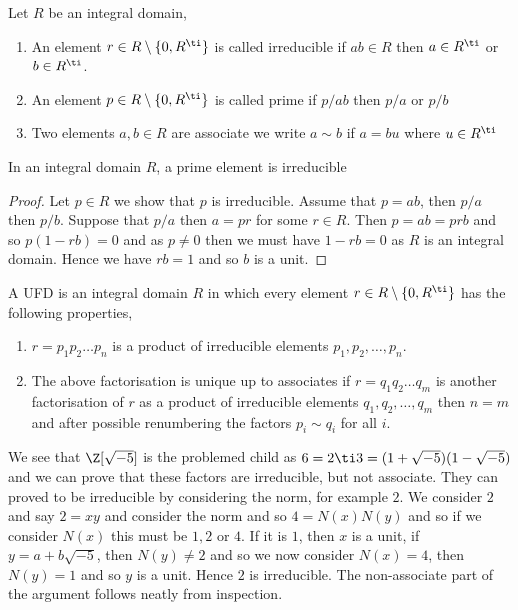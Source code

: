 \begin{ndefi}
  Let $R$ be an integral domain,
  \begin{enumerate}
    \item An element $r \in R \setminus \{0, R^\ti\}$ is called irreducible if $ab \in R$ then $a \in R^\ti$ or $b \in R^\ti$.
    \item An element $p \in R\setminus\{0, R^\ti\}$ is called prime if $p/ab$ then $p/a$ or $p/b$
    \item Two elements $a, b \in R$ are associate we write $a \sim b$ if $a = bu$ where $u \in R^\ti$
  \end{enumerate}
\end{ndefi}

\begin{nprop}
   In an integral domain $R$, a prime element is irreducible
\end{nprop}
\begin{proof}
  Let $p \in R$ we show that $p$ is irreducible. Assume that $p = ab$, then $p/a$ then $p/b$. Suppose that $p/a$ then $a = pr$ for some $r \in R$. Then $p = ab = prb$ and so $p(1 - rb) = 0$ and as $p \ne 0$ then we must have $1 - rb = 0$ as $R$ is an integral domain. Hence we have $rb = 1$ and so $b$ is a unit.
\end{proof}

\begin{ndefi}
  A UFD is an integral domain $R$ in which every element $r \in R\setminus \{0, R^\ti\}$ has the following properties,
  \begin{enumerate}
    \item $r = p_1p_2\dots p_n$ is a product of irreducible elements $p_1, p_2, \dots, p_n$.
    \item The above factorisation is unique up to associates if $r = q_1q_2 \dots q_m$ is another factorisation of $r$ as a product of irreducible elements $q_1, q_2, \dots, q_m$ then $n = m$ and after possible renumbering the factors $p_i \sim q_i$ for all $i$.
  \end{enumerate}
\end{ndefi}

We see that $\Z[\sqrt{-5}]$ is the problemed child as $6 = 2 \ti 3 = (1 + \sqrt{-5})(1 - \sqrt{-5})$ and we can prove that these factors are irreducible, but not associate. They can proved to be irreducible by considering the norm, for example $2$. We consider $2$ and say $2 = xy$ and consider the norm and so $4 = N(x)N(y)$ and so if we consider $N(x)$ this must be $1, 2$ or $4$. If it is $1$, then $x$ is a unit, if $y = a + b\sqrt{-5}$, then $N(y) \ne 2$ and so we now consider $N(x) = 4$, then $N(y) = 1$ and so $y$  is a unit. Hence $2$ is irreducible.
The non-associate part of the argument follows neatly from inspection.

